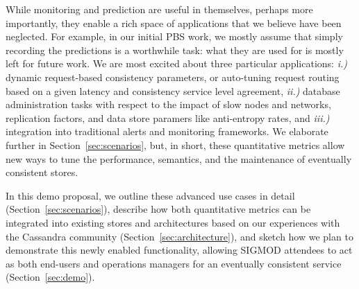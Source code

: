 While monitoring and prediction are useful in themselves, perhaps more
importantly, they enable a rich space of applications that we believe
have been neglected. For example, in our initial PBS work, we mostly
assume that simply recording the predictions is a worthwhile task:
what they are used for is mostly left for future work. We are most
excited about three particular applications: \textit{i.)} dynamic
request-based consistency parameters, or auto-tuning request routing
based on a given latency and consistency service level agreement,
\textit{ii.)} database administration tasks with respect to the impact
of slow nodes and networks, replication factors, and data store
paramers like anti-entropy rates, and \textit{iii.)} integration into
traditional alerts and monitoring frameworks. We elaborate further in
Section~\ref{sec:scenarios}, but, in short, these quantitative metrics
allow new ways to tune the performance, semantics, and the maintenance
of eventually consistent stores.

In this demo proposal, we outline these advanced use cases in detail
(Section~\ref{sec:scenarios}), describe how both quantitative metrics
can be integrated into existing stores and architectures based on our
experiences with the Cassandra community
(Section~\ref{sec:architecture}), and sketch how we plan to
demonstrate this newly enabled functionality, allowing SIGMOD
attendees to act as both end-users and operations managers for an
eventually consistent service (Section~\ref{sec:demo}).

